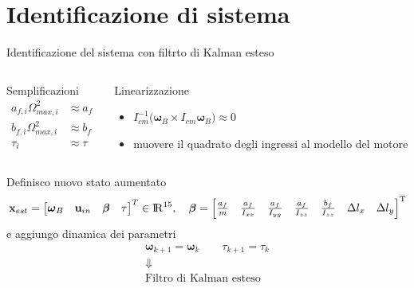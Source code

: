 \documentclass[]{beamer}
\begin{document}
	\section{Identificazione di sistema}
	
	\begin{frame}{Identificazione del sistema con filtrto di Kalman esteso}
		\centering
		\begin{columns}
			\begin{column}{.4\textwidth}
				\centering
				\begin{block}{Semplificazioni}
					\setlength\abovedisplayskip{-10pt}
					\begin{align*}
						a_{f,i}\Omega_{max,i}^2 &\approx a_f \\
						b_{f,i}\Omega_{max,i}^2 &\approx b_f \\
						\tau_i &\approx \tau
					\end{align*}
				\end{block}
			\end{column}
			\begin{column}{.6\textwidth}
				\centering
				\begin{block}{Linearizzazione}
					\begin{itemize}
						\item $I_{cm}^{-1}\bigl(\boldsymbol{\omega}_B \times I_{cm} \boldsymbol{\omega}_B \bigl) \approx 0$
						\item muovere il quadrato degli ingressi al modello del motore
					\end{itemize}
				\end{block}
			\end{column}
		\end{columns}
		\centering
		Definisco nuovo stato aumentato
		\tiny
		\begin{equation*}
			\mathbf{x}_{est}=
			\begin{bmatrix}
				\boldsymbol{\omega}_B & \mathbf{u}_{in} & \boldsymbol{\beta} & \tau
			\end{bmatrix}^T
			\in \rm I\!R^{15}, \quad \boldsymbol{\beta}=
			\begin{bmatrix}
				\frac{a_f}{m} & \frac{a_f}{I_{xx}} & \frac{a_f}{I_{yy}} & \frac{a_f}{I_{zz}} & \frac{b_f}{I_{zz}} & \Delta l_x & \Delta l_y 
			\end{bmatrix}^T
		\end{equation*}
		\normalsize
		e aggiungo dinamica dei parametri
		\begin{gather*}
			\boldsymbol{\omega}_{k+1} = \boldsymbol{\omega}_k \qquad \tau_{k+1} = \tau_{k} \\
			\Downarrow \\
			\text{Filtro di Kalman esteso}
		\end{gather*}
	\end{frame}
	
\end{document}
